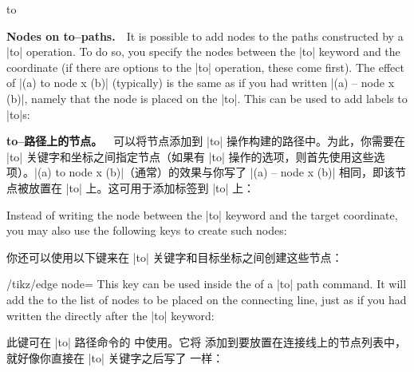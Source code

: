 \begin{pathoperation}{to}{
         }
\begin{codeexample}[]
\end{codeexample}

    \medskip
    \textbf{Nodes on to--paths.}\ \
    It is possible to add nodes to the paths constructed by a |to| operation.
    To do so, you specify the nodes between the |to| keyword and the coordinate
    (if there are options to the |to| operation, these come first). The effect
    of |(a) to node {x} (b)| (typically) is the same as if you had written
    |(a) -- node {x} (b)|, namely that the node is placed on the |to|. This can
    be used to add labels to |to|s:

    \textbf{to--路径上的节点。}\ \
可以将节点添加到 |to| 操作构建的路径中。为此，你需要在 |to| 关键字和坐标之间指定节点（如果有 |to| 操作的选项，则首先使用这些选项）。|(a) to node {x} (b)|（通常）的效果与你写了 |(a) -- node {x} (b)| 相同，即该节点被放置在 |to| 上。这可用于添加标签到 |to| 上：
\begin{codeexample}[]
\end{codeexample}

    Instead of writing the node between the |to| keyword and the target
    coordinate, you may also use the following keys to create such nodes:

    你还可以使用以下键来在 |to| 关键字和目标坐标之间创建这些节点：

    \begin{key}{/tikz/edge node=}
        This key can be used inside the  of a |to| path command.
        It will add the  to the list of nodes to be
        placed on the connecting line, just as if you had written the
        \meta{node specification} directly after the |to| keyword:

        此键可在 |to| 路径命令的 \meta{选项} 中使用。它将  添加到要放置在连接线上的节点列表中，就好像你直接在 |to| 关键字之后写了 \meta{节点规范} 一样：


\end{key}
\end{pathoperation}
